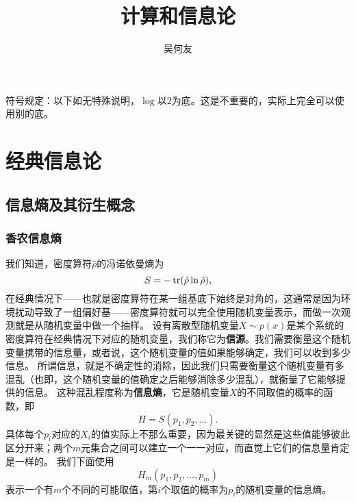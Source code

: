 \documentclass[UTF8, a4paper]{ctexart}
\title{计算和信息论}
\author{吴何友}
\begin{document}
\maketitle

符号规定：以下如无特殊说明，$\log$以$2$为底。这是不重要的，实际上完全可以使用别的底。

\section{经典信息论}

\subsection{信息熵及其衍生概念}

\subsubsection{香农信息熵}

我们知道，密度算符$\hat{\rho}$的冯诺依曼熵为
\begin{equation}
    S = - \trace (\hat{\rho} \ln \hat{\rho}),
\end{equation}
在经典情况下——也就是密度算符在某一组基底下始终是对角的，这通常是因为环境扰动导致了一组偏好基——密度算符就可以完全使用随机变量表示，而做一次观测就是从随机变量中做一个抽样。
设有离散型随机变量$X \sim p(x)$是某个系统的密度算符在经典情况下对应的随机变量，我们称它为\textbf{信源}。我们需要衡量这个随机变量携带的信息量，或者说，这个随机变量的值如果能够确定，我们可以收到多少信息。
所谓信息，就是不确定性的消除，因此我们只需要衡量这个随机变量有多混乱（也即，这个随机变量的值确定之后能够消除多少混乱），就衡量了它能够提供的信息。
这种混乱程度称为\textbf{信息熵}，它是随机变量$X$的不同取值的概率的函数，即
\[
    H = S(p_1, p_2, \ldots).
\]
具体每个$p_i$对应的$X_i$的值实际上不那么重要，因为最关键的显然是这些值能够彼此区分开来；两个$m$元集合之间可以建立一个一一对应，而直觉上它们的信息量肯定是一样的。
我们下面使用
\[
    H_m (p_1, p_2, \ldots, p_m)
\]
表示一个有$m$个不同的可能取值，第$i$个取值的概率为$p_i$的随机变量的信息熵。
\end{document}
